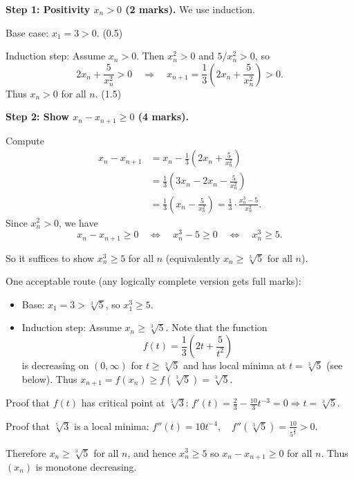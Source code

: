 \documentclass{article}
\begin{document}
\begin{enumerate}[label=(\alph*)]
\begin{mdframed}[linecolor=black, linewidth=1pt]
    \textbf{Step 1: Positivity $x_n>0$ (2 marks).}
    We use induction.
    
    Base case: $x_1=3>0$. \hfill (0.5)
    
    Induction step: Assume $x_n>0$. Then $x_n^2>0$ and $5/x_n^2>0$, so
    \[
    2x_n + \frac{5}{x_n^2} > 0
    \quad\Rightarrow\quad
    x_{n+1} = \frac13\left(2x_n + \frac{5}{x_n^2}\right) > 0.
    \]
    Thus $x_n>0$ for all $n$. \hfill (1.5)
    
    \medskip
    \textbf{Step 2: Show $x_n-x_{n+1}\ge0$ (4 marks).}
    
    Compute
    \[
    \begin{aligned}
    x_n - x_{n+1}
    &= x_n - \frac13\left(2x_n + \frac{5}{x_n^2}\right) \\
    &= \frac13\left(3x_n - 2x_n - \frac{5}{x_n^2}\right) \\
    &= \frac13\left(x_n - \frac{5}{x_n^2}\right)
     = \frac13\cdot\frac{x_n^3-5}{x_n^2}.
    \end{aligned}
    \]
    Since $x_n^2>0$, we have
    \[
    x_n - x_{n+1} \ge 0
    \quad\Longleftrightarrow\quad
    x_n^3-5 \ge 0
    \quad\Longleftrightarrow\quad
    x_n^3 \ge 5.
    \]
    
    So it suffices to show $x_n^3\ge5$ for all $n$ (equivalently $x_n\ge\sqrt[3]{5}$ for all $n$).
    
    One acceptable route (any logically complete version gets full marks):
    
    \begin{itemize}
      \item Base: $x_1 = 3 > \sqrt[3]{5}$, so $x_1^3\ge 5$.
      \item Induction step: Assume $x_n\ge\sqrt[3]{5}$. Note that the function
      \[
      f(t) = \frac13\left(2t + \frac{5}{t^2}\right)
      \]
      is decreasing on $(0,\infty)$ for $t\ge\sqrt[3]{5}$ and has local minima at $t=\sqrt[3]{5}$ (see below). Thus $x_{n+1}=f(x_n)\ge f(\sqrt[3]{5}) = \sqrt[3]{5}$.
    \end{itemize}

    Proof that $f(t)$ has critical point at $\sqrt[5]{3}$: $f'(t) = \frac{2}{3} - \frac{10}{3}t^{-3}=0 \Rightarrow t = \sqrt[3]{5}$.
    
    Proof that $\sqrt[5]{3}$ is a local minima: $f''(t) = 10t^{-4}, \quad f''(\sqrt[3]{5}) = \frac{10}{5^{\frac{4}{3}}} > 0$.
    
    Therefore $x_n\ge\sqrt[3]{5}$ for all $n$, and hence $x_n^3\ge 5$ so $x_n-x_{n+1}\ge0$ for all $n$. Thus $(x_n)$ is monotone decreasing.  
    

\end{mdframed}
\end{enumerate}
\end{document}

